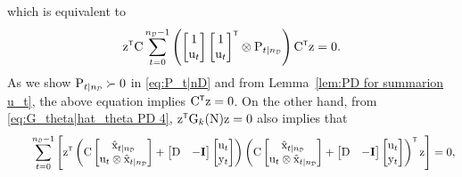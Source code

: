 which is equivalent to
\begin{equation}
\begin{split}    
    \vcz^\tr \mxC 
    \sum_{t=0}^{\nD-1}
    \left( \begin{bmatrix}  1 \\ \vcu_t \end{bmatrix}
    \begin{bmatrix}  1 \\ \vcu_t \end{bmatrix}^\tr 
    \otimes \mxP_{t|\nD} \right)
    \mxC^\tr \vcz = 0. 
\end{split}
\end{equation}
As we show $\mxP_{t|\nD} \succ 0$ in \eqref{eq:P_t|nD} and from Lemma~\ref{lem:PD for summarion u_t}, the above equation implies $\mxC^\tr \vcz = 0$. On the other hand, from \eqref{eq:G_theta|hat_theta PD 4}, $\vcz^\tr \mxG_k(\mxN) \vcz = 0$ also implies that 
\begin{equation}
    \begin{split}
    &\qquad 
    \sum_{t=0}^{\nD-1} \left[    \vcz^\tr
    \left( \mxC \begin{bmatrix} \hat{\vcx}_{t|\nD}\\ \vcu_t \otimes \hat{\vcx}_{t|\nD} \end{bmatrix} + \begin{bmatrix}\mxD & -\mathbf{I}\end{bmatrix}
    \begin{bmatrix} \vcu_t \\ \vcy_t \end{bmatrix} \right) 
    \left( \mxC \begin{bmatrix} \hat{\vcx}_{t|\nD}\\ \vcu_t \otimes \hat{\vcx}_{t|\nD} \end{bmatrix} 
    + \begin{bmatrix}\mxD & -\mathbf{I}\end{bmatrix}
    \begin{bmatrix} \vcu_t \\ \vcy_t \end{bmatrix}
    \right)^\tr \vcz \right] = 0,\\
    \end{split}
\end{equation}

